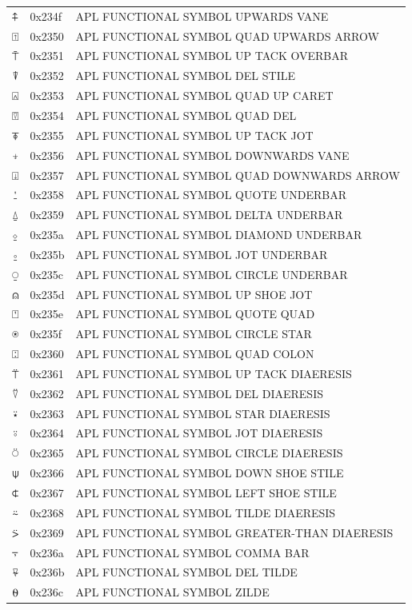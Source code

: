 \documentclass[12pt, twoside]{article}
\begin{document}
\begin{longtable}{L{1.0cm} L{2.0cm} >{\footnotesize}L{10cm}}
$⍏$&0x234f&APL FUNCTIONAL SYMBOL UPWARDS VANE\\
$⍐$&0x2350&APL FUNCTIONAL SYMBOL QUAD UPWARDS ARROW\\
$⍑$&0x2351&APL FUNCTIONAL SYMBOL UP TACK OVERBAR\\
$⍒$&0x2352&APL FUNCTIONAL SYMBOL DEL STILE\\
$⍓$&0x2353&APL FUNCTIONAL SYMBOL QUAD UP CARET\\
$⍔$&0x2354&APL FUNCTIONAL SYMBOL QUAD DEL\\
$⍕$&0x2355&APL FUNCTIONAL SYMBOL UP TACK JOT\\
$⍖$&0x2356&APL FUNCTIONAL SYMBOL DOWNWARDS VANE\\
$⍗$&0x2357&APL FUNCTIONAL SYMBOL QUAD DOWNWARDS ARROW\\
$⍘$&0x2358&APL FUNCTIONAL SYMBOL QUOTE UNDERBAR\\
$⍙$&0x2359&APL FUNCTIONAL SYMBOL DELTA UNDERBAR\\
$⍚$&0x235a&APL FUNCTIONAL SYMBOL DIAMOND UNDERBAR\\
$⍛$&0x235b&APL FUNCTIONAL SYMBOL JOT UNDERBAR\\
$⍜$&0x235c&APL FUNCTIONAL SYMBOL CIRCLE UNDERBAR\\
$⍝$&0x235d&APL FUNCTIONAL SYMBOL UP SHOE JOT\\
$⍞$&0x235e&APL FUNCTIONAL SYMBOL QUOTE QUAD\\
$⍟$&0x235f&APL FUNCTIONAL SYMBOL CIRCLE STAR\\
$⍠$&0x2360&APL FUNCTIONAL SYMBOL QUAD COLON\\
$⍡$&0x2361&APL FUNCTIONAL SYMBOL UP TACK DIAERESIS\\
$⍢$&0x2362&APL FUNCTIONAL SYMBOL DEL DIAERESIS\\
$⍣$&0x2363&APL FUNCTIONAL SYMBOL STAR DIAERESIS\\
$⍤$&0x2364&APL FUNCTIONAL SYMBOL JOT DIAERESIS\\
$⍥$&0x2365&APL FUNCTIONAL SYMBOL CIRCLE DIAERESIS\\
$⍦$&0x2366&APL FUNCTIONAL SYMBOL DOWN SHOE STILE\\
$⍧$&0x2367&APL FUNCTIONAL SYMBOL LEFT SHOE STILE\\
$⍨$&0x2368&APL FUNCTIONAL SYMBOL TILDE DIAERESIS\\
$⍩$&0x2369&APL FUNCTIONAL SYMBOL GREATER-THAN DIAERESIS\\
$⍪$&0x236a&APL FUNCTIONAL SYMBOL COMMA BAR\\
$⍫$&0x236b&APL FUNCTIONAL SYMBOL DEL TILDE\\
$⍬$&0x236c&APL FUNCTIONAL SYMBOL ZILDE\\

\end{longtable}
\end{document}
